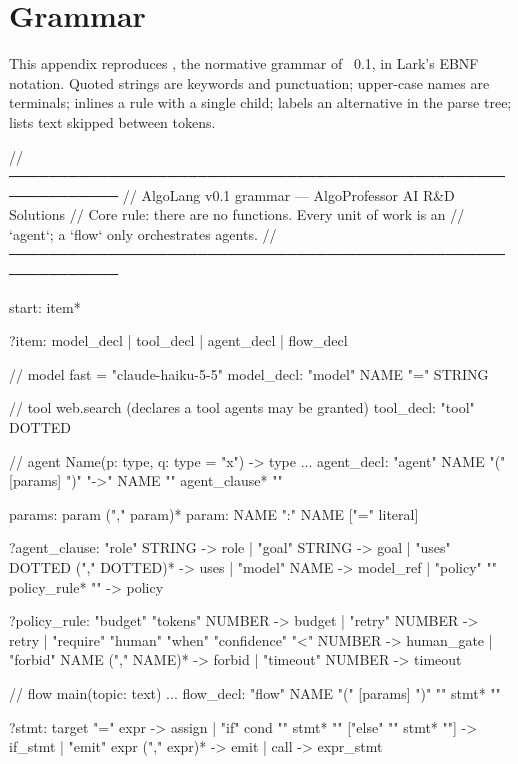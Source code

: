 \chapter{Grammar}
\label{app:grammar}

This appendix reproduces , the normative grammar of \algolang~0.1, in Lark's EBNF notation. Quoted strings are keywords and punctuation; upper-case names are terminals;  inlines a rule with a single child;  labels an alternative in the parse tree;  lists text skipped between tokens.

\begin{plaincode}[title=grammar.lark]
// ─────────────────────────────────────────────────────────────
//  AlgoLang v0.1 grammar  —  AlgoProfessor AI R&D Solutions
//  Core rule: there are no functions. Every unit of work is an
//  `agent`; a `flow` only orchestrates agents.
// ─────────────────────────────────────────────────────────────

start: item*

?item: model_decl
     | tool_decl
     | agent_decl
     | flow_decl

// model fast = "claude-haiku-5-5"
model_decl: "model" NAME "=" STRING

// tool web.search   (declares a tool agents may be granted)
tool_decl: "tool" DOTTED

// agent Name(p: type, q: type = "x") -> type { ... }
agent_decl: "agent" NAME "(" [params] ")" "->" NAME "{" agent_clause* "}"

params: param ("," param)*
param: NAME ":" NAME ["=" literal]

?agent_clause: "role" STRING            -> role
             | "goal" STRING            -> goal
             | "uses" DOTTED ("," DOTTED)* -> uses
             | "model" NAME             -> model_ref
             | "policy" "{" policy_rule* "}" -> policy

?policy_rule: "budget" "tokens" NUMBER                       -> budget
            | "retry" NUMBER                                 -> retry
            | "require" "human" "when" "confidence" "<" NUMBER -> human_gate
            | "forbid" NAME ("," NAME)*                      -> forbid
            | "timeout" NUMBER                               -> timeout

// flow main(topic: text) { ... }
flow_decl: "flow" NAME "(" [params] ")" "{" stmt* "}"

?stmt: target "=" expr                                   -> assign
     | "if" cond "{" stmt* "}" ["else" "{" stmt* "}"]    -> if_stmt
     | "emit" expr ("," expr)*                           -> emit
     | call                                              -> expr_stmt


\end{plaincode}
